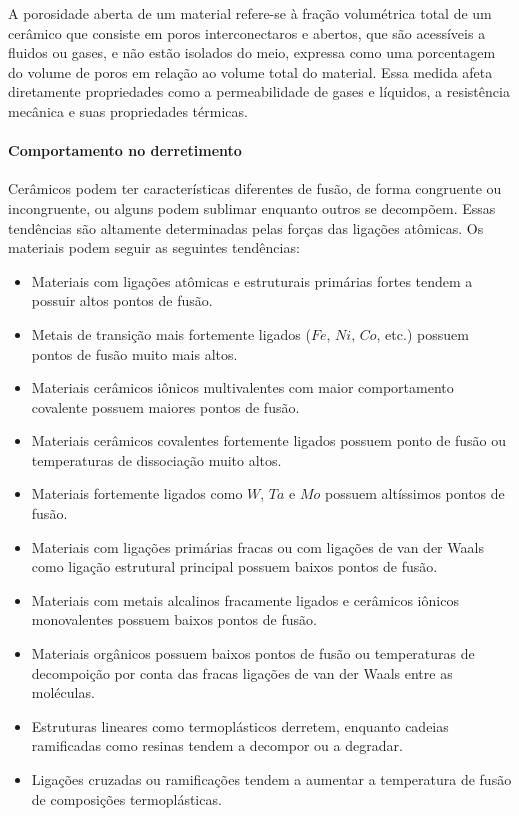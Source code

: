 A porosidade aberta de um material refere-se à fração volumétrica total de um cerâmico que consiste em poros interconectaros e abertos, que são acessíveis a fluidos ou gases, e não estão isolados do meio, expressa como uma porcentagem do volume de poros em relação ao volume total do material. Essa medida afeta diretamente propriedades como a permeabilidade de gases e líquidos, a resistência mecânica e suas propriedades térmicas.

\paragraph*{Comportamento no derretimento} Cerâmicos podem ter características diferentes de fusão, de forma congruente ou incongruente, ou alguns podem sublimar enquanto outros se decompõem. Essas tendências são altamente determinadas pelas forças das ligações atômicas. Os materiais podem seguir as seguintes tendências:

\begin{itemize}
  \item Materiais com ligações atômicas e estruturais primárias fortes tendem a possuir altos pontos de fusão.
  \item Metais de transição mais fortemente ligados ($Fe$, $Ni$, $Co$, etc.) possuem pontos de fusão muito mais altos.
  \item Materiais cerâmicos iônicos multivalentes com maior comportamento covalente possuem maiores pontos de fusão.
  \item Materiais cerâmicos covalentes fortemente ligados possuem ponto de fusão ou temperaturas de dissociação muito altos.
  \item Materiais fortemente ligados como $W$, $Ta$ e $Mo$ possuem altíssimos pontos de fusão.
  \item Materiais com ligações primárias fracas ou com ligações de van der Waals como ligação estrutural principal possuem baixos pontos de fusão.
  \item Materiais com metais alcalinos fracamente ligados e cerâmicos iônicos monovalentes possuem baixos pontos de fusão.
  \item Materiais orgânicos possuem baixos pontos de fusão ou temperaturas de decompoição por conta das fracas ligações de van der Waals entre as moléculas.
  \item Estruturas lineares como termoplásticos derretem, enquanto cadeias ramificadas como resinas tendem a decompor ou a degradar.
  \item Ligações cruzadas ou ramificações tendem a aumentar a temperatura de fusão de composições termoplásticas.
\end{itemize}

